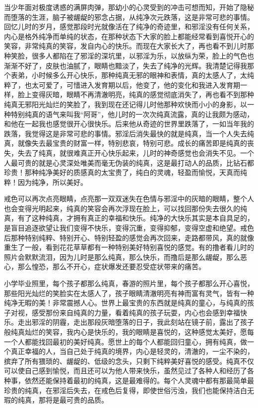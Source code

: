 当少年面对极度诱惑的满屏肉弹，那幼小的心灵受到的冲击可想而知，开始了隐秘而堕落的生涯，脑子被龌龊的邪念占据，从纯净次元跌落，这是非常可悲的事情。回忆儿时的岁月，感觉那段时光就像活在了纯净的奇迹里，和邪淫没有任何关系，内心是格外纯净而单纯的状态，在那种状态下大家的脸上都能经常看到喜悦开心的笑容，非常纯真的笑容，发自内心的快乐。而现在大家长大了，再也看不到儿时那种笑脸，很多人都陷在了邪淫的深坑里，以邪淫为乐，以放纵为荣，脸上的气色也渐渐不好了，皮肤也油腻了，眼睛也黯淡了，失去了纯净的光辉。我清楚记得我那个表弟，小时候多么开心快乐，那种纯真无邪的眼神和表情，真的太感人了，太纯粹了，也太可爱了，可惜进入发育期以后，他变了，他的变化和我进入发育期一样，脸上变得灰暗，眼睛不再清澈明亮，纯真的感觉彻底消失了，再也看不到那种纯真无邪阳光灿烂的笑脸了，我到现在还记得儿时他那种欢快而小小的身影，以一种特别纯真的语气来叫我“阿哥”，他儿时的一次次纯真流露，真的让我颇为感动，和他在一起我也感觉很开心很快乐。后来他从奇迹的世界里跌落了，一如当年我的跌落，我觉得这是非常可悲的事情。邪淫后消失最快的就是纯真，当一个人失去纯真，就像失去最宝贵的财富一样，特别悲哀，特别可悲。成长的痛苦即是纯真的丧失，失去了纯真，就很难真正开心快乐起来，儿时的神奇感觉也会消失不见。一个人最可贵的就是心灵深处唯美而毫无伪装的纯真，这是最打动人的品质，比钻石都珍贵！那种纯净美好的质感真的太宝贵了，纯白的灵魂，轻盈而愉悦，天真而纯粹！因为纯净，所以美好。

戒色可以再次点亮眼睛，点亮那一双双迷失在色情与邪淫中的灰暗的眼睛，整个人也会变得光明起来，纯真的笑容会再次浮现在脸上，可以找回那份失去很久的纯真，有了这种纯真，才拥有真正的幸福和快乐。纯净的大快乐其实是本自具足的，是盲目追逐欲望让我们变得不快乐，变得沉重，变得抑郁，变得空虚和绝望。戒色后那种特别纯粹、特别开心、特别轻盈的感觉会再次回来，走路都带风，真的就像重生了一般，看到花花草草都有一种特别美好特别喜悦的感觉。有的撸者看儿时的照片会默默流泪，因为儿时是那么纯真，那么快乐，而撸后是那么龌龊，那么恶心，那么惶恐，那么不开心，症状爆发还要忍受症状带来的痛苦。

小学毕业照里，每个孩子都那么纯真，春游的照片里，每个孩子都那么开心喜悦，那些阳光灿烂的笑脸实在太感人了，孩子眼睛清澈明亮有神而富有灵气，皆有一种纯净无暇的美！非常震撼人心。世界上最宝贵的东西就是纯真的童心，与纯真的孩子对视，感受那份来自纯真的力量，看着纯真的孩子玩耍，内心也会感到幸福快乐。走出邪淫的阴霾，走出那段灰暗堕落的日子，我此刻站在镜子前，露出了孩子般纯真灿烂的笑容，我内心是快乐的，我的眼睛是喜悦的，这种感觉太美好，愿每一个人都能找回最初的美好纯真。愿世上的每个人都能回归童心，拥有纯真，做一个真正幸福的人，当自己处于纯真的境界，内心是轻灵的，清澈的，一尘不染的，摈弃了所有猥琐的、龌龊的、低级的念头，只剩下纯粹美好喜悦的感受。纯真不仅可以使自己感到愉悦，而且还可以为他人带来快乐，虽然见过了各种人和经历了各种事，依然还能保持着最初的纯真，这是最难得的。每个人灵魂中都有那最简单最珍贵的纯真，在邪淫后失去，在戒色后复得，即使世俗污浊，我们也能保持洁白无瑕的纯真，那将是最可贵的品质。

